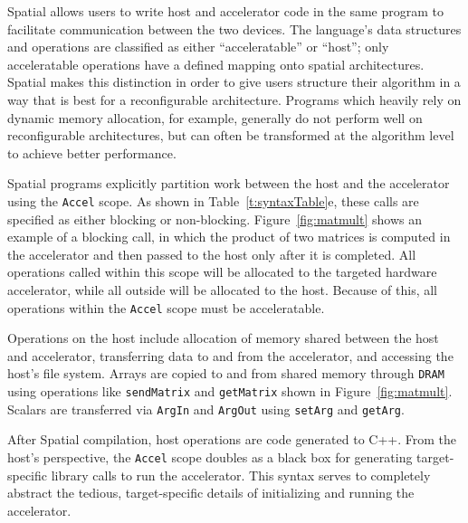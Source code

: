 Spatial allows users to write host and accelerator code in the same program to facilitate communication between the two devices.
The language's data structures and operations are classified as either ``acceleratable'' or ``host''; only acceleratable operations have a defined mapping onto spatial architectures.
Spatial makes this distinction in order to give users structure their algorithm in a way that is best for a reconfigurable architecture.
Programs which heavily rely on dynamic memory allocation, for example, generally do not perform well on reconfigurable architectures, but can often be transformed at the algorithm level to achieve better performance.



Spatial programs explicitly partition work between the host and the accelerator using the \texttt{\small{Accel}} scope. As shown in Table~\ref{t:syntaxTable}e, these calls are specified as either blocking or non-blocking.  Figure~\ref{fig:matmult} shows an example of a blocking call, in which the product of two
matrices is computed in the accelerator and then passed to the host only after it is completed.
All operations called within this scope will be allocated to the targeted hardware accelerator, while all outside will be allocated to the host.
Because of this, all operations within the \texttt{\small{Accel}} scope must be acceleratable.

Operations on the host include allocation of memory shared between the host and accelerator, transferring data to and from the accelerator, and accessing the host's file system.
Arrays are copied to and from shared memory through \texttt{\small{DRAM}} using operations like \texttt{\small{sendMatrix}} and \texttt{\small{getMatrix}} shown in Figure~\ref{fig:matmult}. Scalars are transferred via \texttt{\small{ArgIn}} and \texttt{\small{ArgOut}} using \texttt{\small{setArg}} and \texttt{\small{getArg}}.

After Spatial compilation, host operations are code generated to C++.
From the host's perspective, the \texttt{\small{Accel}} scope doubles as a black box for generating target-specific library calls to run the accelerator.
This syntax serves to completely abstract the tedious, target-specific details of initializing and running the accelerator.


